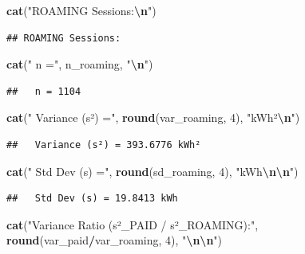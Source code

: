 \documentclass[
  12pt,
]{article}
\newenvironment{Shaded}{\begin{snugshade}}{\end{snugshade}}
\newcommand{\DecValTok}[1]{\textcolor[rgb]{0.00,0.00,0.81}{#1}}
\newcommand{\FunctionTok}[1]{\textcolor[rgb]{0.13,0.29,0.53}{\textbf{#1}}}
\newcommand{\NormalTok}[1]{#1}
\newcommand{\SpecialCharTok}[1]{\textcolor[rgb]{0.81,0.36,0.00}{\textbf{#1}}}
\newcommand{\StringTok}[1]{\textcolor[rgb]{0.31,0.60,0.02}{#1}}
\begin{document}
\begin{Shaded}
\begin{Highlighting}[]
\FunctionTok{cat}\NormalTok{(}\StringTok{"ROAMING Sessions:}\SpecialCharTok{\textbackslash{}n}\StringTok{"}\NormalTok{)}
\end{Highlighting}
\end{Shaded}

\begin{verbatim}
## ROAMING Sessions:
\end{verbatim}

\begin{Shaded}
\begin{Highlighting}[]
\FunctionTok{cat}\NormalTok{(}\StringTok{"  n ="}\NormalTok{, n\_roaming, }\StringTok{"}\SpecialCharTok{\textbackslash{}n}\StringTok{"}\NormalTok{)}
\end{Highlighting}
\end{Shaded}

\begin{verbatim}
##   n = 1104
\end{verbatim}

\begin{Shaded}
\begin{Highlighting}[]
\FunctionTok{cat}\NormalTok{(}\StringTok{"  Variance (s²) ="}\NormalTok{, }\FunctionTok{round}\NormalTok{(var\_roaming, }\DecValTok{4}\NormalTok{), }\StringTok{"kWh²}\SpecialCharTok{\textbackslash{}n}\StringTok{"}\NormalTok{)}
\end{Highlighting}
\end{Shaded}

\begin{verbatim}
##   Variance (s²) = 393.6776 kWh²
\end{verbatim}

\begin{Shaded}
\begin{Highlighting}[]
\FunctionTok{cat}\NormalTok{(}\StringTok{"  Std Dev (s) ="}\NormalTok{, }\FunctionTok{round}\NormalTok{(sd\_roaming, }\DecValTok{4}\NormalTok{), }\StringTok{"kWh}\SpecialCharTok{\textbackslash{}n\textbackslash{}n}\StringTok{"}\NormalTok{)}
\end{Highlighting}
\end{Shaded}

\begin{verbatim}
##   Std Dev (s) = 19.8413 kWh
\end{verbatim}

\begin{Shaded}
\begin{Highlighting}[]
\FunctionTok{cat}\NormalTok{(}\StringTok{"Variance Ratio (s²\_PAID / s²\_ROAMING):"}\NormalTok{, }\FunctionTok{round}\NormalTok{(var\_paid}\SpecialCharTok{/}\NormalTok{var\_roaming,}
    \DecValTok{4}\NormalTok{), }\StringTok{"}\SpecialCharTok{\textbackslash{}n\textbackslash{}n}\StringTok{"}\NormalTok{)}
\end{Highlighting}
\end{Shaded}
\end{document}
